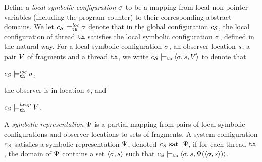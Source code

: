 Define a {\em local symbolic configuration} $\sigma$ to be
a mapping from local non-pointer
variables (including the program counter) to their corresponding abstract
domains.
We let $c_{\mathcal S} \models_{{\tt th}}^{\mathit{loc}} \sigma$ denote that in the
global configuration $c_{\mathcal S}$, the
local configuration of thread ${\tt th}$ satisfies the local symbolic
configuration $\sigma$, defined in the natural way.
For a local symbolic configuration
$\sigma$, an observer location $s$, a pair
$V$ of fragments and a thread ${\tt th}$, we write
$c_{\mathcal S} \models_{{\tt th}}
\left\langle\sigma,s,V\right\rangle$ to denote that
\begin{inparaenum}[(i)]
\item $c_{\mathcal S} \models_{{\tt th}}^{\mathit{loc}} \sigma$,
\item the observer is in location $s$, and
\item  $c_{\mathcal S} \models_{{\tt th}}^{\mathit{heap}} V$.
\end{inparaenum}
\begin{definition}
  \label{def:symbrep}
    A {\em symbolic representation} $\Psi$ is a partial mapping from
pairs of local symbolic configurations and observer locations to
sets of fragments.
A system configuration $c_{\mathcal S}$ satisfies a symbolic representation $\Psi$,
denoted $c_{\mathcal S} \mbox{ sat \ } \Psi$,
if for each thread ${\tt th}$, 
the domain of $\Psi$ contains a set
$\left\langle\sigma,s\right\rangle$ such that
$c_{\mathcal S} \models_{{\tt th}}
\left\langle\sigma,s,\Psi(\left\langle\sigma,s\right\rangle)\right\rangle$.
\end{definition}








